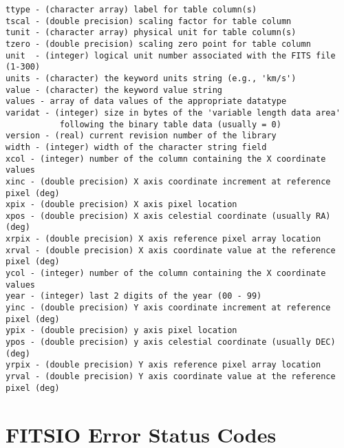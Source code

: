 \documentclass[11pt]{book}
\begin{document}
\begin{verbatim}
ttype - (character array) label for table column(s)
tscal - (double precision) scaling factor for table column
tunit - (character array) physical unit for table column(s)
tzero - (double precision) scaling zero point for table column
unit  - (integer) logical unit number associated with the FITS file (1-300)
units - (character) the keyword units string (e.g., 'km/s')
value - (character) the keyword value string
values - array of data values of the appropriate datatype
varidat - (integer) size in bytes of the 'variable length data area'
           following the binary table data (usually = 0)
version - (real) current revision number of the library
width - (integer) width of the character string field
xcol - (integer) number of the column containing the X coordinate values
xinc - (double precision) X axis coordinate increment at reference pixel (deg)
xpix - (double precision) X axis pixel location
xpos - (double precision) X axis celestial coordinate (usually RA) (deg)
xrpix - (double precision) X axis reference pixel array location
xrval - (double precision) X axis coordinate value at the reference pixel (deg)
ycol - (integer) number of the column containing the X coordinate values
year - (integer) last 2 digits of the year (00 - 99)
yinc - (double precision) Y axis coordinate increment at reference pixel (deg)
ypix - (double precision) y axis pixel location
ypos - (double precision) y axis celestial coordinate (usually DEC) (deg)
yrpix - (double precision) Y axis reference pixel array location
yrval - (double precision) Y axis coordinate value at the reference pixel (deg)
\end{verbatim}

\chapter{   FITSIO Error Status Codes }
\end{document}
